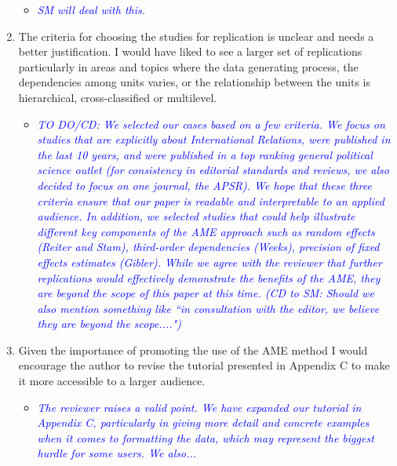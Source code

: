 \begin{enumerate}
\begin{itemize}
		\item \textcolor{blue}{ \emph{
		SM will deal with this.
		}}
	\end{itemize}
	\item The criteria for choosing the studies for replication is unclear and needs a better justification. I would have liked to see a larger set of replications particularly in areas and topics where the data generating process, the dependencies among units varies, or the relationship between the units is hierarchical, cross-classified or multilevel.
	\begin{itemize}
		\item \textcolor{blue}{ \emph{
		TO DO/CD: We selected our cases based on a few criteria. We focus on studies that are explicitly about International Relations, were published in the last 10 years, and were published in a top ranking general political science outlet (for consistency in editorial standards and reviews, we also decided to focus on one journal, the APSR). We hope that these three criteria ensure that our paper is readable and interpretable to an applied audience. In addition, we selected studies that could help illustrate different key components of the AME approach such as random effects (Reiter and Stam), third-order dependencies (Weeks), precision of fixed effects estimates (Gibler).  While we agree with the reviewer that further replications would effectively demonstrate the benefits of the AME, they are beyond the scope of this paper at this time. (CD to SM: Should we also mention something like ``in consultation with the editor, we believe they are beyond the scope....") 
		}}
	\end{itemize}
	\item Given the importance of promoting the use of the AME method I would encourage the author to revise the tutorial presented in Appendix C to make it more accessible to a larger audience.
	\begin{itemize}
		\item \textcolor{blue}{ \emph{
		The reviewer raises a valid point. We have expanded our tutorial in Appendix C, particularly in giving more detail and concrete examples when it comes to formatting the data, which may represent the biggest hurdle for some users. We also...
		}}
	\end{itemize}
\end{enumerate}
